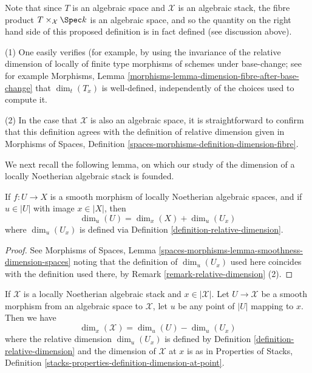 \noindent
Note that since $T$ is an algebraic space and $\mathcal{X}$ is an
algebraic stack, the fibre product $T \times_{\mathcal{X}} \Spec k$
is an algebraic space, and so the quantity on the right hand side of
this proposed definition is in fact defined (see discussion above).

\begin{remark}
\label{remark-relative-dimension}
(1)
One easily verifies (for example, by using the invariance
of the relative dimension of locally of finite type morphisms of schemes
under base-change; see for example
Morphisms, Lemma \ref{morphisms-lemma-dimension-fibre-after-base-change}
that $\dim_t(T_x)$ is well-defined, independently of the choices
used to compute it.

\medskip\noindent
(2)
In the case that $\mathcal{X}$ is also an algebraic space,
it is straightforward to confirm that this definition agrees with
the definition of relative dimension given in
Morphisms of Spaces, Definition
\ref{spaces-morphisms-definition-dimension-fibre}.
\end{remark}

\noindent
We next recall the following lemma, on which our study of
the dimension of a locally Noetherian algebraic stack is founded.

\begin{lemma}
\label{lemma-behaviour-of-dimensions-wrt-smooth-morphisms}
If $f: U \to X$ is a smooth morphism of locally Noetherian algebraic
spaces, and
if $u \in |U|$ with image $x \in |X|$, then
$$
\dim_u (U) = \dim_x(X) + \dim_{u} (U_x)
$$
where $\dim_u (U_x)$ is defined via
Definition \ref{definition-relative-dimension}.
\end{lemma}

\begin{proof}
See Morphisms of Spaces, Lemma
\ref{spaces-morphisms-lemma-smoothness-dimension-spaces}
noting that the definition of $\dim_u (U_x)$ used here coincides with
the definition used there, by Remark \ref{remark-relative-dimension} (2).
\end{proof}

\begin{lemma}
\label{lemma-dimension-for-stacks}
If $\mathcal{X}$ is a locally Noetherian algebraic stack and
$x \in |\mathcal{X}|$. Let $U \to \mathcal{X}$ be a smooth morphism
from an algebraic space to $\mathcal{X}$, let $u$ be any point of $|U|$
mapping to $x$. Then we have
$$
\dim_x(\mathcal{X}) =  \dim_u(U) - \dim_{u}(U_x)
$$
where the relative dimension $\dim_u(U_x)$ is defined
by Definition \ref{definition-relative-dimension} and the
dimension of $\mathcal{X}$ at $x$ is as in
Properties of Stacks, Definition
\ref{stacks-properties-definition-dimension-at-point}.
\end{lemma}

